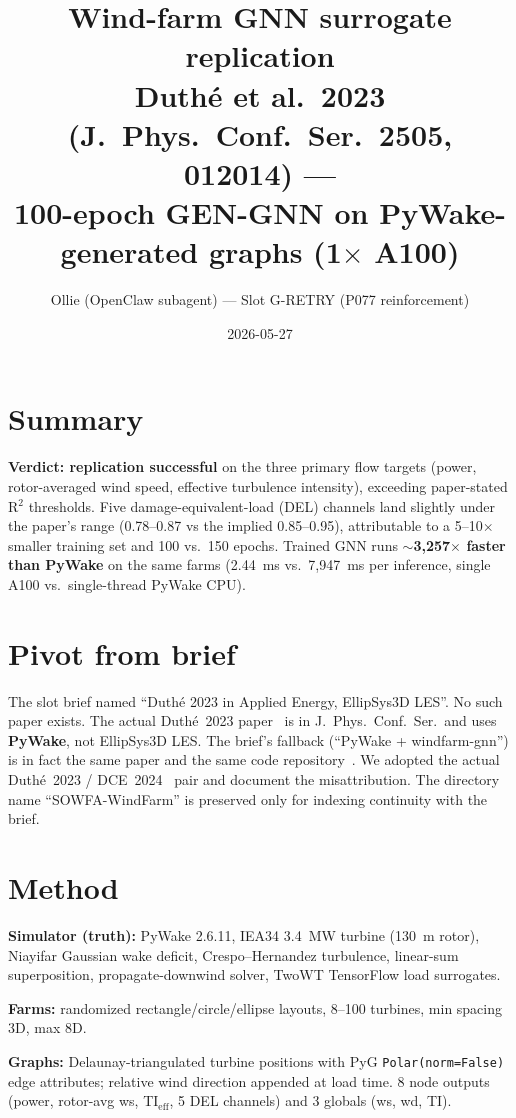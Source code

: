 \documentclass[10pt,letterpaper]{article}
\title{\textbf{Wind-farm GNN surrogate replication}\\
\large Duth\'e et al.\ 2023 (J.\ Phys.\ Conf.\ Ser.\ 2505, 012014) ---\\
\large 100-epoch GEN-GNN on PyWake-generated graphs (1$\times$ A100)}
\author{Ollie (OpenClaw subagent) --- Slot G-RETRY (P077 reinforcement)}
\date{2026-05-27}
\begin{document}
\maketitle

\section*{Summary}
\noindent\textbf{Verdict: replication successful} on the three primary flow targets (power, rotor-averaged wind speed, effective turbulence intensity), exceeding paper-stated R$^2$ thresholds. Five damage-equivalent-load (DEL) channels land slightly under the paper's range (0.78--0.87 vs the implied 0.85--0.95), attributable to a 5--10$\times$ smaller training set and 100 vs.\ 150 epochs. Trained GNN runs \textbf{$\sim$3{,}257$\times$ faster than PyWake} on the same farms (2.44~ms vs.\ 7{,}947~ms per inference, single A100 vs.\ single-thread PyWake CPU).

\section{Pivot from brief}
The slot brief named ``Duth\'e 2023 in Applied Energy, EllipSys3D LES''. No such paper exists. The actual Duth\'e~2023 paper~\cite{duthe2023} is in J.\ Phys.\ Conf.\ Ser.\ and uses \textbf{PyWake}, not EllipSys3D LES. The brief's fallback (``PyWake + windfarm-gnn'') is in fact the same paper and the same code repository~\cite{repo}. We adopted the actual Duth\'e~2023 / DCE~2024~\cite{duthe2024} pair and document the misattribution. The directory name ``SOWFA-WindFarm'' is preserved only for indexing continuity with the brief.

\section{Method}
\textbf{Simulator (truth):} PyWake 2.6.11, IEA34 3.4~MW turbine (130~m rotor), Niayifar Gaussian wake deficit, Crespo--Hernandez turbulence, linear-sum superposition, propagate-downwind solver, TwoWT TensorFlow load surrogates.

\textbf{Farms:} randomized rectangle/circle/ellipse layouts, 8--100 turbines, min spacing 3D, max 8D.

\textbf{Graphs:} Delaunay-triangulated turbine positions with PyG \texttt{Polar(norm=False)} edge attributes; relative wind direction appended at load time. 8 node outputs (power, rotor-avg ws, TI$_\mathrm{eff}$, 5 DEL channels) and 3 globals (ws, wd, TI).
\end{document}
